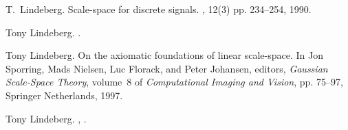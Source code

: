\documentclass[pdflatex,11pt]{aghdpl}
\begin{document}
\begin{thebibliography}{10}
T.~Lindeberg.
\newblock Scale-space for discrete signals.
, 12(3) pp. 234--254, 1990.

Tony Lindeberg.
.

Tony Lindeberg.
\newblock On the axiomatic foundations of linear scale-space.
\newblock In Jon Sporring, Mads Nielsen, Luc Florack, and Peter Johansen,
  editors, {\em Gaussian Scale-Space Theory}, volume~8 of {\em Computational
  Imaging and Vision}, pp. 75--97, Springer Netherlands, 1997.

Tony Lindeberg.
,
.

\end{thebibliography}

%

\appendix






\end{document}
